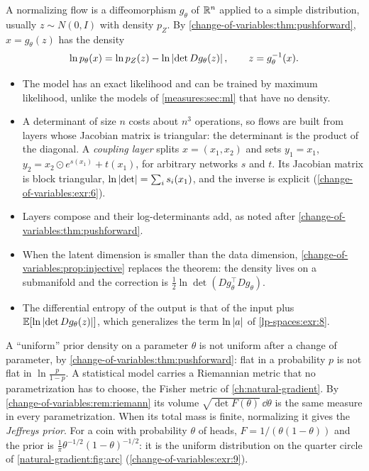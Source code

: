 \begin{notechapter}
\begin{mlthread}
A normalizing flow is a diffeomorphism $g_\theta$ of $\mathbb{R}^n$ applied to a
simple distribution, usually $z\sim N(0, I)$ with density $p_Z$. By
\cref{change-of-variables:thm:pushforward}, $x = g_\theta(z)$ has the
density
\[
  \ln p_\theta(x) = \ln p_Z(z) - \ln\left|\det Dg_\theta(z)\right| ,
  \qquad z = g_\theta^{-1}(x) .
\]
\begin{itemize}[nosep]
  \item The model has an exact likelihood and can be trained by
        maximum likelihood, unlike the models of
        \cref{measures:sec:ml} that have no density.
  \item A determinant of size $n$ costs about $n^3$ operations, so
        flows are built from layers whose Jacobian matrix is
        triangular: the determinant is the product of the diagonal. A
        \emph{coupling layer} splits $x = (x_1, x_2)$ and sets
        $y_1 = x_1$, $y_2 = x_2\odot e^{s(x_1)} + t(x_1)$, for arbitrary
        networks $s$ and $t$. Its Jacobian matrix is block triangular,
        $\ln\left|\det\right| = \sum_is_i(x_1)$, and the inverse is explicit
        (\cref{change-of-variables:exr:6}).
  \item Layers compose and their log-determinants add, as noted after
        \cref{change-of-variables:thm:pushforward}.
  \item When the latent dimension is smaller than the data dimension,
        \cref{change-of-variables:prop:injective} replaces the theorem:
        the density lives on a submanifold and the correction is
        $\frac12\ln\det(Dg_\theta^\top Dg_\theta)$.
  \item The differential entropy of the output is that of the input
        plus $\mathbb{E}[\ln\left|\det Dg_\theta(z)\right|]$, which generalizes the
        term $\ln\left|a\right|$ of \cref{lp-spaces:exr:8}.
\end{itemize}
\end{mlthread}

\begin{mlthread}
A ``uniform'' prior density on a parameter $\theta$ is not uniform
after a change of parameter, by
\cref{change-of-variables:thm:pushforward}: flat in a probability $p$
is not flat in $\ln\frac p{1 - p}$. A statistical model carries a
Riemannian metric that no parametrization has to choose, the Fisher
metric of \cref{ch:natural-gradient}. By
\cref{change-of-variables:rem:riemann} its volume
$\sqrt{\det F(\theta)}\,\dd\theta$ is the same measure in every
parametrization. When its total mass is finite, normalizing it gives
the \emph{Jeffreys prior}. For a coin with probability $\theta$ of
heads, $F = 1/(\theta(1 - \theta))$ and the prior is
$\frac1\pi\theta^{-1/2}(1 - \theta)^{-1/2}$: it is the uniform
distribution on the quarter circle of \cref{natural-gradient:fig:arc}
(\cref{change-of-variables:exr:9}).
\end{mlthread}


\end{notechapter}
